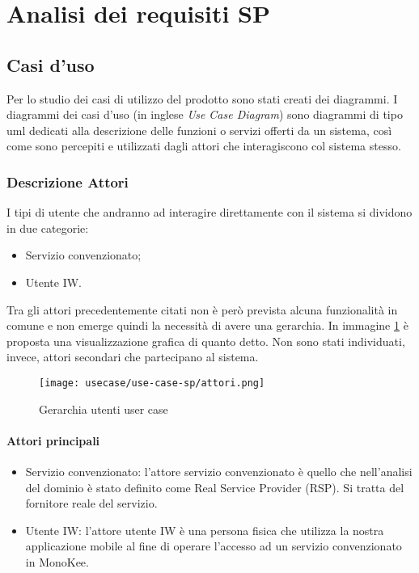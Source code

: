 \section{Analisi dei requisiti SP}
\subsection{Casi d'uso}

Per lo studio dei casi di utilizzo del prodotto sono stati creati dei diagrammi.
I diagrammi dei casi d'uso (in inglese \emph{Use Case Diagram}) sono diagrammi di tipo \gls{uml} dedicati alla descrizione delle funzioni o servizi offerti da un sistema, così come sono percepiti e utilizzati dagli attori che interagiscono col sistema stesso.

\subsubsection{Descrizione Attori}
I tipi di utente che andranno ad interagire direttamente con il sistema si dividono in due categorie: 
\begin{itemize}
    \item Servizio convenzionato;
    \item Utente IW.
\end{itemize}
Tra gli attori precedentemente citati non è però prevista alcuna funzionalità in comune e non emerge quindi la necessità di avere una gerarchia. In immagine \ref{fig:ger-actors-sp} è proposta una visualizzazione grafica di quanto detto.
Non sono stati individuati, invece, attori secondari che partecipano al sistema.
\begin{figure}[!htbp]    
    \centering
    \texttt{[image: usecase/use-case-sp/attori.png]} 
    \caption{Gerarchia utenti user case}
    \label{fig:ger-actors-sp} 
\end{figure}
\paragraph{Attori principali}
\begin{itemize}
    \item Servizio convenzionato: l’attore servizio convenzionato è quello che nell’analisi del dominio è stato definito come Real Service Provider (RSP). Si tratta del fornitore reale del servizio.
    \item Utente IW: l’attore utente IW è una persona fisica che utilizza la nostra applicazione mobile al fine di operare l’accesso ad un servizio convenzionato in MonoKee.
\end{itemize}

